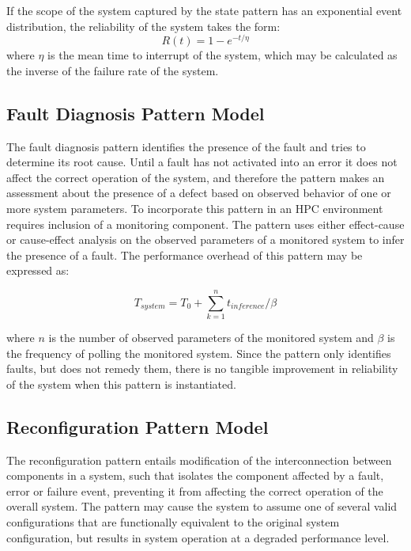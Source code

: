 If the scope of the system captured by the state pattern has an exponential event distribution, the reliability of the system takes the form: 
\begin{equation}
R(t) = 1 - e^{-t/\eta}
\label{eq:reliability2}
\end{equation}
where $\eta$ is the mean time to interrupt of the system, which may be calculated as the inverse of the failure rate of the system.

\subsection{Fault Diagnosis Pattern Model}
The fault diagnosis pattern identifies the presence of the fault and tries to determine its root cause. 
Until a fault has not activated into an error it does not affect the correct operation of the system, and therefore the pattern makes an assessment about the presence of a defect based on observed behavior of one or more system parameters. To incorporate this pattern in an HPC environment requires inclusion of a monitoring component. The pattern uses either effect-cause or cause-effect analysis on the observed parameters of a monitored system to infer the presence of a fault. The performance overhead of this pattern may be expressed as:
 
\begin{equation}
T_{system} = T_{0} + \sum_{k=1}^{n} t_{inference}/\beta
\label{eq:diagnosis1}
\end{equation}

where $n$ is the number of observed parameters of the monitored system and $\beta$ is the frequency of polling the monitored system. Since the pattern only identifies faults, but does not remedy them, there is no tangible improvement in reliability of the system when this pattern is instantiated.  

\subsection{Reconfiguration Pattern Model}
The reconfiguration pattern entails modification of the interconnection between components in a system, such that isolates the component affected by a fault, error or failure event, preventing it from affecting the correct operation of the overall system. The pattern may cause the system to assume one of several valid configurations that are functionally equivalent to the original system configuration, but results in system operation at a degraded performance level. 

